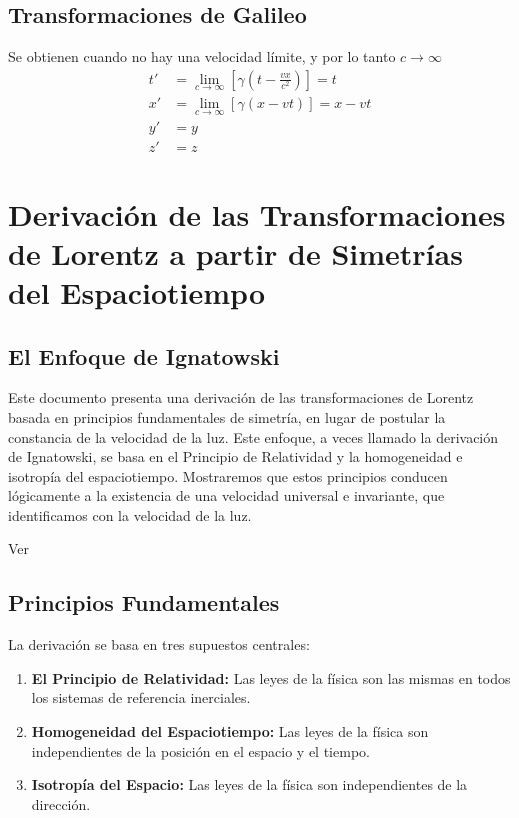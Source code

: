 \documentclass[11pt,a4paper]{article}
\begin{document}
\subsection{Transformaciones de Galileo}
Se obtienen cuando no hay una velocidad límite, y por lo tanto $c\to \infty$
\begin{align*}
t' &= \lim_{c\to\infty}\left[\gamma \left( t - \frac{vx}{c^2} \right)\right] 
    = t\\
x' &= \lim_{c\to\infty}\left[\gamma (x - vt)\right]  = x - vt \\
y' &= y \\
z' &= z
\end{align*}




\section{Derivación de las Transformaciones de Lorentz a partir de Simetrías del Espaciotiempo}
\subsection{El Enfoque de Ignatowski}
Este documento presenta una derivación de las transformaciones de Lorentz basada en principios fundamentales de simetría, en lugar de postular la constancia de la velocidad de la luz. Este enfoque, a veces llamado la derivación de Ignatowski, se basa en el Principio de Relatividad y la homogeneidad e isotropía del espaciotiempo. Mostraremos que estos principios conducen lógicamente a la existencia de una velocidad universal e invariante, que identificamos con la velocidad de la luz.

Ver \cite{Datta:2022cpw} %


\subsection{Principios Fundamentales}
La derivación se basa en tres supuestos centrales:
\begin{enumerate}
    \item \textbf{El Principio de Relatividad:} Las leyes de la física son las mismas en todos los sistemas de referencia inerciales.
    \item \textbf{Homogeneidad del Espaciotiempo:} Las leyes de la física son independientes de la posición en el espacio y el tiempo.
    \item \textbf{Isotropía del Espacio:} Las leyes de la física son independientes de la dirección.
\end{enumerate}
\end{document}
